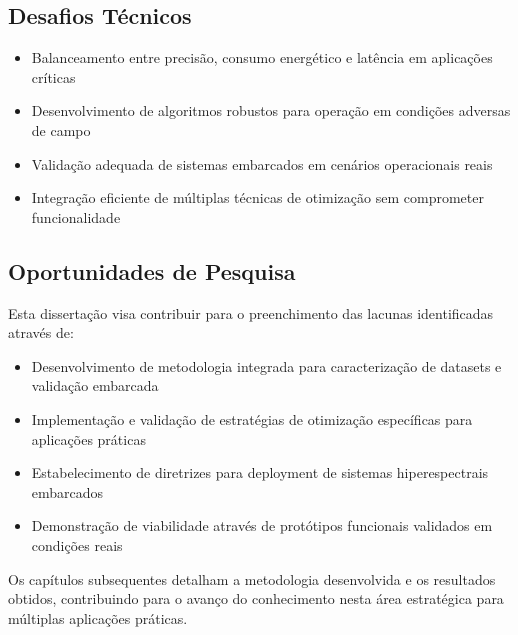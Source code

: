 \subsection{Desafios Técnicos}
\begin{itemize}
    \item Balanceamento entre precisão, consumo energético e latência em aplicações críticas
    \item Desenvolvimento de algoritmos robustos para operação em condições adversas de campo
    \item Validação adequada de sistemas embarcados em cenários operacionais reais
    \item Integração eficiente de múltiplas técnicas de otimização sem comprometer funcionalidade
\end{itemize}

\subsection{Oportunidades de Pesquisa}
Esta dissertação visa contribuir para o preenchimento das lacunas identificadas através de:
\begin{itemize}
    \item Desenvolvimento de metodologia integrada para caracterização de datasets e validação embarcada
    \item Implementação e validação de estratégias de otimização específicas para aplicações práticas
    \item Estabelecimento de diretrizes para deployment de sistemas hiperespectrais embarcados
    \item Demonstração de viabilidade através de protótipos funcionais validados em condições reais
\end{itemize}

Os capítulos subsequentes detalham a metodologia desenvolvida e os resultados obtidos, contribuindo para o avanço do conhecimento nesta área estratégica para múltiplas aplicações práticas.
